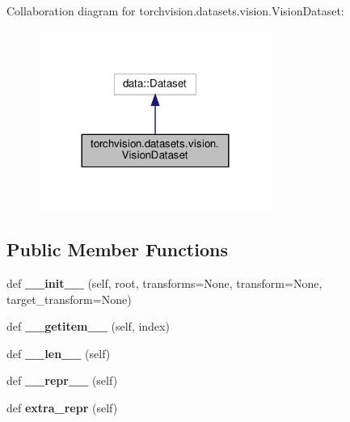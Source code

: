Collaboration diagram for torchvision.\+datasets.\+vision.\+Vision\+Dataset\+:
\nopagebreak
\begin{figure}[H]
\begin{center}
\leavevmode
\includegraphics[width=216pt]{classtorchvision_1_1datasets_1_1vision_1_1VisionDataset__coll__graph}
\end{center}
\end{figure}
\subsection*{Public Member Functions}
\begin{DoxyCompactItemize}
\item 
\mbox{\label{classtorchvision_1_1datasets_1_1vision_1_1VisionDataset_afaab2235a0f5195628c1dc2f77c0c374}} 
def {\bfseries \+\_\+\+\_\+init\+\_\+\+\_\+} (self, root, transforms=None, transform=None, target\+\_\+transform=None)
\item 
\mbox{\label{classtorchvision_1_1datasets_1_1vision_1_1VisionDataset_a12602844a432d9bd7659a7756550b709}} 
def {\bfseries \+\_\+\+\_\+getitem\+\_\+\+\_\+} (self, index)
\item 
\mbox{\label{classtorchvision_1_1datasets_1_1vision_1_1VisionDataset_aa665e0a455393e4dfb3f419a59dff23b}} 
def {\bfseries \+\_\+\+\_\+len\+\_\+\+\_\+} (self)
\item 
\mbox{\label{classtorchvision_1_1datasets_1_1vision_1_1VisionDataset_aa0364a479c896f3016d1137846c419cc}} 
def {\bfseries \+\_\+\+\_\+repr\+\_\+\+\_\+} (self)
\item 
\mbox{\label{classtorchvision_1_1datasets_1_1vision_1_1VisionDataset_a7bfd92c0784ec2cf80825638f2095738}} 
def {\bfseries extra\+\_\+repr} (self)
\end{DoxyCompactItemize}
